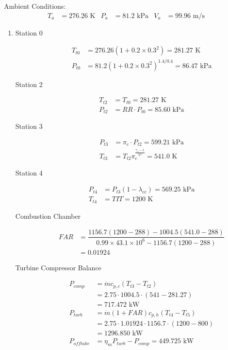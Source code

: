 \documentclass{article}
\begin{document}
Ambient Conditions:
\begin{align*}
    T_a &= 276.26 \text{ K}&P_a &= 81.2 \text{ kPa}&V_a &= 99.96 \text{ m/s}
\end{align*}
\begin{enumerate}
    \item \begin{description}
        \item[Station 0]
        \begin{align*}
            T_{t0} &= 276.26(1 + 0.2\times 0.3^2) = 281.27 \text{ K}\\
            P_{t0} &= 81.2(1 + 0.2\times 0.3^2)^{1.4/0.4} = 86.47 \text{ kPa}
        \end{align*}
        \item[Station 2]
        \begin{align*}
            T_{t2} &= T_{t0} = 281.27 \text{ K} \\
            P_{t2} &= RR \cdot P_{t0} = 85.60 \text{ kPa}
        \end{align*}
        \item[Station 3]
        \begin{align*}
            P_{t3} &= \pi_c \cdot P_{t2} = 599.21 \text{ kPa}\\
            T_{t3} &= T_{t2}\pi_c^{\frac{\gamma_c - 1}{\eta \gamma}} = 541.0 \text{ K}
        \end{align*}
        \item[Station 4]
        \begin{align*}
            P_{t4} &= P_{t3}(1-\lambda_{cc}) = 569.25 \text{ kPa}\\
            T_{t4} & = TIT = 1200 \text{ K}
        \end{align*}
        \item[Combustion Chamber]
        \begin{align*}
            FAR &= \dfrac{1156.7(1200-288) - 1004.5(541.0 - 288)}{0.99\times 43.1\times 10^6 - 1156.7(1200 - 288)}\\
            &= 0.01924
        \end{align*}

        \item[Turbine Compressor Balance]
        \begin{align*}
            P_{comp} &= \dot{m} c_{p, c} (T_{t3} - T_{t2}) \\
            &=2.75\cdot 1004.5 \cdot(541 - 281.27) \\ 
            &=717.472 \text{ kW}\\
            P_{turb} &= \dot{m} (1 + FAR) c_{p, h} (T_{t4} - T_{t5}) \\
            &=2.75\cdot 1.01924\cdot 1156.7 \cdot(1200 - 800) \\ 
            &=1296.850 \text{ kW}\\
            P_{offtake} &= \eta_m P_{turb} - P_{comp} = 449.725 \text{ kW}
        \end{align*}
    

\end{description}
\end{enumerate}
\end{document}
